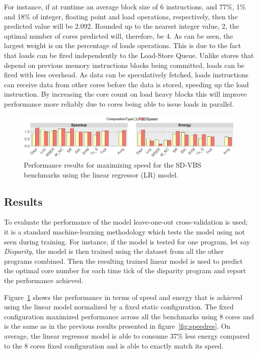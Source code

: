 For instance, if at runtime an average block size of 6 instructions, and 77\%, 1\% and 18\% of integer, floating point and load operations, respectively, then the predicted value will be 2.092.
Rounded up to the nearest integer value, 2, the optimal number of cores predicted will, therefore, be 4.
As can be seen, the largest weight is on the percentage of loads operations.
This is due to the fact that loads can be fired independently to the Load-Store Queue.
Unlike stores that depend on previous memory instructions blocks being committed, loads can be fired with less overhead.
As data can be speculatively fetched, loads instructions can receive data from other cores before the data is stored, speeding up the load instruction.
By increasing the core count on load heavy blocks this will improve performance more reliably due to cores being able to issue loads in parallel.

\begin{figure}[t]
    \centering
	\includegraphics[width=1\textwidth]{cases-paper/graphics/results/lr_speed.pdf}
\vspace*{-8mm}
    \caption{Performance results for maximizing speed for the SD-VBS benchmarks using the linear regressor (LR) model.}%
    \label{fig:speedlr}
\vspace{5mm}
\end{figure}
\subsection{Results}

To evaluate the performance of the model leave-one-out cross-validation  is used; it is a standard machine-learning methodology which tests the model using not seen during training.
For instance, if the model is tested for one program, let say \textit{Disparity}, the model is then trained using the dataset from all the other programs combined.
Then the resulting trained linear model is used to predict the optimal core number for each time tick of the disparity program and report the performance achieved.

Figure~\ref{fig:speedlr} shows the performance in terms of speed and energy that is achieved using the linear model normalized by a fixed static configuration.
The fixed configuration maximized performance across all the benchmarks using 8 cores and is the same as in the previous results presented in figure~\ref{fig:speedres}.
On average, the linear regressor model is able to consume 37\% less energy compared to the 8 cores fixed configuration and is able to exactly match its speed.

